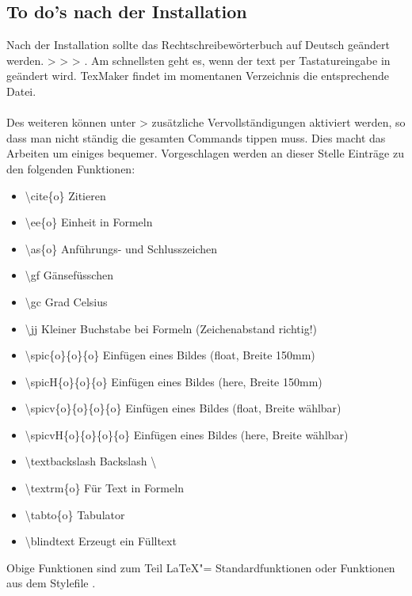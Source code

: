 \subsection{To do's nach der Installation}%
%
Nach der Installation sollte das Rechtschreibewörterbuch auf Deutsch geändert werden. \linebreak {}  >  >  > . Am schnellsten geht es, wenn der text  per Tastatureingabe in  geändert wird. TexMaker findet im momentanen Verzeichnis die entsprechende Datei. \\\\%
%
Des weiteren können unter  >  zusätzliche Vervollständigungen aktiviert werden, so dass man nicht ständig die gesamten Commands tippen muss. Dies macht das Arbeiten um einiges bequemer. Vorgeschlagen werden an dieser Stelle Einträge zu den folgenden Funktionen:%
%
\begin{samepage}
\begin{itemize}
\item \textbackslash cite\{o\} \tabto{5cm} Zitieren%
\item \textbackslash ee\{o\} \tabto{5cm} Einheit in Formeln%
\item \textbackslash as\{o\} \tabto{5cm} Anführungs- und Schlusszeichen%
\item \textbackslash gf\tabto{5cm} Gänsefüsschen%
\item \textbackslash gc\tabto{5cm} Grad Celsius %
\item \textbackslash jj\tabto{5cm} Kleiner Buchstabe  bei Formeln (Zeichenabstand richtig!)%
\item \textbackslash spic\{o\}\{o\}\{o\} \tabto{5cm} Einfügen eines Bildes (float, Breite 150mm)%
\item \textbackslash spicH\{o\}\{o\}\{o\} \tabto{5cm} Einfügen eines Bildes (here, Breite 150mm)%
\item \textbackslash spicv\{o\}\{o\}\{o\}\{o\} \tabto{5cm} Einfügen eines Bildes (float, Breite wählbar)%
\item \textbackslash spicvH\{o\}\{o\}\{o\}\{o\} \tabto{5cm} Einfügen eines Bildes (here, Breite wählbar)%
\item \textbackslash textbackslash \tabto{5cm} Backslash \textbackslash%
\item \textbackslash textrm\{o\} \tabto{5cm} Für Text in Formeln%
\item \textbackslash tabto\{o\} \tabto{5cm} Tabulator%
\item \textbackslash blindtext \tabto{5cm} Erzeugt ein Fülltext %
\end{itemize}
\end{samepage}
%
Obige Funktionen sind zum Teil \LaTeX "= Standardfunktionen oder Funktionen aus dem Stylefile .%
%